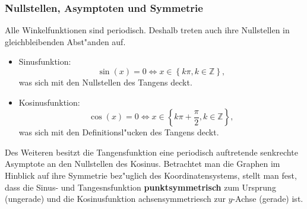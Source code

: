\subsubsection{Nullstellen, Asymptoten und Symmetrie}
Alle Winkelfunktionen sind periodisch. Deshalb treten auch ihre Nullstellen in gleichbleibenden Abst"anden auf.
\begin{itemize}
\item Sinusfunktion:
\begin{equation*}
 \sin(x) = 0 \iff x \in \left\{ k \pi, k \in \mathbb{Z} \right\},
\end{equation*}
was sich mit den Nullstellen des Tangens deckt.
\item Kosinusfunktion: 
\begin{equation*}
 \cos(x) = 0 \iff x \in \left\{ k \pi + \frac{\pi}{2}, k \in \mathbb{Z} \right\},
\end{equation*}
was sich mit den Definitionsl"ucken des Tangens deckt.
\end{itemize}
Des Weiteren besitzt die Tangensfunktion eine periodisch auftretende senkrechte Asymptote an den Nullstellen des Kosinus.
Betrachtet man die Graphen im Hinblick auf ihre Symmetrie bez"uglich des Koordinatensystems, stellt man fest, dass die Sinus- und Tangesnsfunktion \textbf{punktsymmetrisch} zum Ursprung (ungerade) und die Kosinusfunktion achsensymmetriesch zur $y$-Achse (gerade) ist.